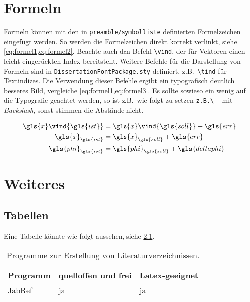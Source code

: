 
\chapter{Formeln} \label{sec:Formeln}

Formeln können mit den in \texttt{preamble/symbolliste} definierten Formelzeichen eingefügt werden. So werden die Formelzeichen direkt korrekt verlinkt, siehe \cref{eq:formel1,eq:formel2}. Beachte auch den Befehl \texttt{\textbackslash vind}, der für Vektoren einen leicht eingerückten Index bereitstellt. Weitere Befehle für die Darstellung von Formeln sind in \texttt{DissertationFontPackage.sty} definiert, z.B.\ \texttt{\textbackslash tind} für Textindizes. Die Verwendung dieser Befehle ergibt ein typografisch deutlich besseres Bild, vergleiche \cref{eq:formel1,eq:formel3}. Es sollte sowieso ein wenig auf die Typografie geachtet werden, so ist z.B.\ wie folgt zu setzen \texttt{z.B.\textbackslash} -- mit \textit{Backslash}, sonst stimmen die Abstände nicht.

\begin{align}
\label{eq:formel1}
\gls{x}\vind{\gls{ist}} &= \gls{x}\vind{\gls{soll}} + \gls{err} \\
\label{eq:formel3}
\gls{x}_{\gls{ist}} &= \gls{x}_{\gls{soll}} + \gls{err} \\
\label{eq:formel2}
\gls{phi}_{\gls{ist}} &= \gls{phi}_{\gls{soll}} + \gls{deltaphi}
\end{align}

\blindtext[3]


\chapter{Weiteres}

\section{Tabellen}
\label{sec:HFS_Wahrnehmung}

Eine Tabelle könnte wie folgt aussehen, siehe \cref{tab:programme}.

\begin{table}[hbt]
	\centering
	\caption{Programme zur Erstellung von Literaturverzeichnissen.}
	\label{tab:programme}
	\begin{tabular}{lll}
		\toprule
		Programm            & quelloffen und frei &  Latex-geeignet                 \\ \midrule
		JabRef              &     ja              &    ja    \\ \bottomrule
	\end{tabular}
\end{table}

